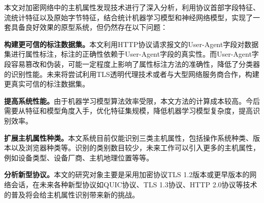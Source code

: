 本文对加密网络中的主机属性发现技术进行了深入分析，利用协议首部字段特征、流统计特征以及原始字节特征，结合统计机器学习模型和神经网络模型，实现了一套具备良好效果的原型系统，但仍然存在以下问题：

\textbf{构建更可信的标注数据集。}本文利用HTTP协议请求报文的User-Agent字段对数据集进行属性标注，标注的正确性依赖于User-Agent字段的真实性。而User-Agent字段容易篡改和伪装，可能一定程度上影响了属性标注方法的准确性，降低了分类器的识别性能。未来将尝试利用TLS透明代理技术或者与大型网络服务商合作，构建更真实可信的标注数据集。

\textbf{提高系统性能。}由于机器学习模型算法效率受限，本文方法的计算成本较高。今后需要从特征和模型角度入手，优化特征集规模，降低机器学习模型复杂度，提高识别效率。

\textbf{扩展主机属性种类。}本文系统目前仅能识别三类主机属性，包括操作系统种类、版本以及浏览器种类等。识别的类别数目较少，未来工作可以引入更多的主机属性，例如设备类型、设备厂商、主机地理位置等等。

\textbf{分析新型协议。}本文的研究对象主要是采用加密协议TLS 1.2版本或更早版本的网络会话，在未来各种新型协议如QUIC协议、TLS 1.3协议、HTTP 2.0协议等技术的普及将会给主机属性识别带来新的挑战。